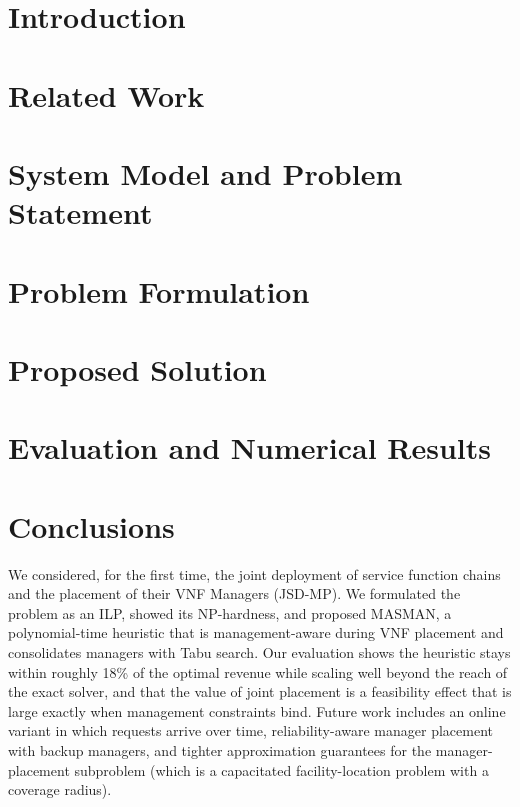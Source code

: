 \documentclass[futureinternet,article,submit,pdftex,moreauthors]{Definitions/mdpi}
\begin{document}
\section{Introduction}\label{sec:introduction}


\section{Related Work}\label{sec:related-works}


\section{System Model and Problem Statement}\label{sec:system-model}


\section{Problem Formulation}\label{sec:formulation}


\section{Proposed Solution}\label{sec:solution}


\section{Evaluation and Numerical Results}\label{sec:results}


\section{Conclusions}\label{sec:conclusion}
We considered, for the first time, the joint deployment of service function
chains and the placement of their VNF Managers (JSD-MP). We formulated the
problem as an ILP, showed its NP-hardness, and proposed MASMAN, a
polynomial-time heuristic that is management-aware during VNF placement and
consolidates managers with Tabu search. Our evaluation shows the heuristic stays
within roughly 18\% of the optimal revenue while scaling well beyond the reach of
the exact solver, and that the value of joint placement is a feasibility effect
that is large exactly when management constraints bind. Future work includes an
online variant in which requests arrive over time, reliability-aware manager
placement with backup managers, and tighter approximation guarantees for the
manager-placement subproblem (which is a capacitated facility-location problem
with a coverage radius).
\end{document}
